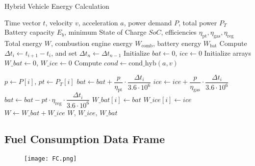	\begin{algorithm}
		\caption{Hybrid Vehicle Energy Calculation}
		\label{alg: hyb_energy}
		\begin{algorithmic}
			\Require Time vector $t$, velocity $v$, acceleration $a$, power demand $P$, total power $P_T$
			\Require Battery capacity $E_b$, minimum State of Charge $SoC$, efficiencies $\eta_{\text{pt}}, \eta_{\text{gas}}, \eta_{\text{reg}}$
			\Ensure Total energy $W$, combustion engine energy $W_{\text{comb}}$, battery energy $W_{\text{bat}}$
			\State Compute $\Delta t_i \gets t_{i+1} - t_i$, and set $\Delta t_{n} \gets \Delta t_{n-1}$
			\State Initialize $bat \gets 0$, $ice \gets 0$
			\State Initialize arrays $W\_bat \gets 0$, $W\_ice \gets 0$
			\State Compute $cond \gets \text{cond\_hyb}(a, v)$

			    \State $p \gets P[i]$, $pt \gets P_T[i]$
			     
		    	        \State $bat \gets bat + \dfrac{p}{\eta_{\text{pt}}} \cdot \dfrac{\Delta t_i}{3.6 \cdot 10^6}$
			        \Else
			            \State $ice \gets ice + \dfrac{p}{\eta_{\text{gas}}} \cdot \dfrac{\Delta t_i}{3.6 \cdot 10^6}$
			        \EndIf
			    \Else {}
			        \State $bat \gets bat - pt \cdot \eta_{\text{reg}} \cdot \dfrac{\Delta t_i}{3.6 \cdot 10^6}$
			    \EndIf
			    \State $W\_bat[i] \gets bat$
			    \State $W\_ice[i] \gets ice$
			\EndFor
			\State $W \gets W\_bat + W\_ice$
			\State \Return $W$, $W\_ice$, $W\_bat$
		\end{algorithmic}
	\end{algorithm}
	
\subsection*{Fuel Consumption Data Frame}
	\begin{figure}[H]
		\begin{center}
			\texttt{[image: FC.png]}
		\end{center}
	\end{figure}
